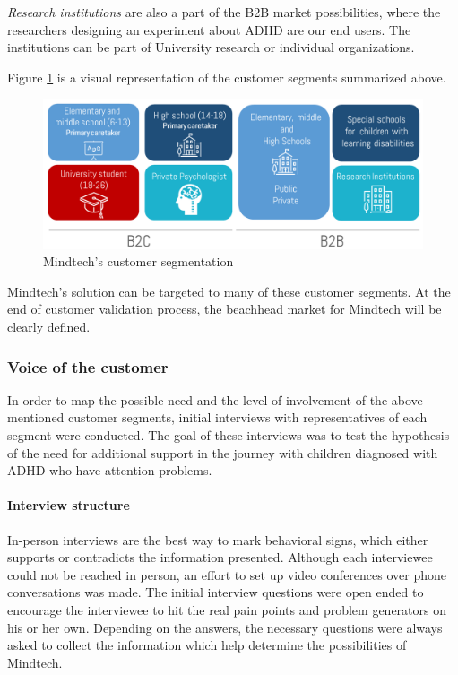 \documentclass[letterpaper,10pt]{article}
\begin{document}
\textit{Research institutions} are also a part of the B2B market possibilities, where the researchers designing an experiment about ADHD are our end users. The institutions can be part of University research or individual organizations.


Figure \ref{img:customer_segments} is a visual representation of the customer segments summarized above.

\begin{figure}[!htb]
\centering
\includegraphics[scale=0.5]{cust_segments.png}
\caption{Mindtech's customer segmentation}
\label{img:customer_segments}
\end{figure}


Mindtech's solution can be targeted to many of these customer segments. At the end of customer validation process, the beachhead market for Mindtech will be clearly defined. 

\subsubsection{Voice of the customer}

In order to map the possible need and the level of involvement of the above-mentioned customer segments, initial interviews with representatives of each segment were conducted. The goal of these interviews was to test the hypothesis of the need for additional support in the journey with children diagnosed with ADHD who have attention problems. 

\paragraph{Interview structure}

In-person interviews are the best way to mark behavioral signs, which either supports or contradicts the information presented. Although each interviewee could not be reached in person, an effort to set up video conferences over phone conversations was made. The initial interview questions were open ended to encourage the interviewee to hit the real pain points and problem generators on his or her own.
Depending on the answers, the necessary questions were always asked to collect the information which help determine the possibilities of Mindtech.
\end{document}
